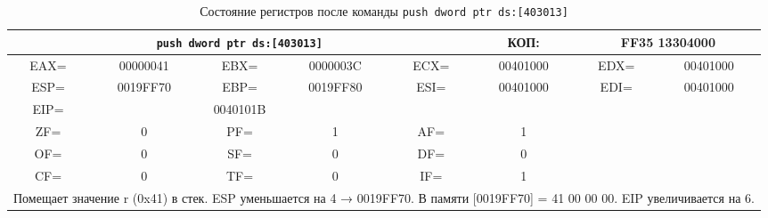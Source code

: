 \begin{table}[H]
    \centering
    \caption{Состояние регистров после команды \texttt{push dword ptr ds:[403013]}}
    \label{tab:after_push_r}
    \small
    \renewcommand{\arraystretch}{1.3}
    \begin{tabular}{|c|c|c|c|c|c|c|c|}
    \hline
    \multicolumn{5}{|c|}{\cellcolor{green!40}\textbf{\texttt{push dword ptr ds:[403013]}}} & \cellcolor{green!20} КОП: & \multicolumn{2}{c|}{\cellcolor{green!20} FF35 13304000} \\
    \hline
    \cellcolor{blue!30} EAX= & 00000041 & \cellcolor{blue!30} EBX= & 0000003C & \cellcolor{blue!30} ECX= & 00401000 & \cellcolor{blue!30} EDX= & 00401000 \\
    \hline
    \cellcolor{blue!30} ESP= & \cellcolor{red!70} 0019FF70 & \cellcolor{blue!30} EBP= & 0019FF80 & \cellcolor{blue!30} ESI= & 00401000 & \cellcolor{blue!30} EDI= & 00401000 \\
    \hline
    \cellcolor{blue!30} EIP= & \multicolumn{3}{c|}{\cellcolor{red!70} 0040101B} & \multicolumn{4}{c|}{} \\
    \hline
    \cellcolor{pink} ZF= & 0 & \cellcolor{pink} PF= & 1 & \cellcolor{pink} AF= & 1 & \multicolumn{2}{c|}{\cellcolor{gray!50}} \\
    \cline{1-6}
    \cellcolor{pink} OF= & 0 & \cellcolor{pink} SF= & 0 & \cellcolor{pink} DF= & 0 & \multicolumn{2}{c|}{\cellcolor{gray!50}} \\
    \cline{1-6}
    \cellcolor{pink} CF= & 0 & \cellcolor{pink} TF= & 0 & \cellcolor{pink} IF= & 1 & \multicolumn{2}{c|}{\cellcolor{gray!50}} \\
    \hline
    \multicolumn{8}{|p{14cm}|}{Помещает значение r (0x41) в стек. ESP уменьшается на 4 → 0019FF70. В памяти [0019FF70] = 41 00 00 00. EIP увеличивается на 6.} \\
    \hline
    \end{tabular}
\end{table}

